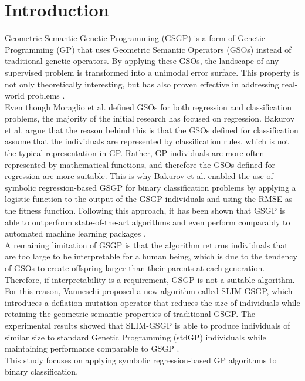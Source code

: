 \documentclass[manuscript, review, anonymous]{acmart} %
\begin{document}
\section{Introduction}
\label{cha:intro}
Geometric Semantic Genetic Programming (GSGP) \cite{Moraglio2012} is a form of Genetic Programming (GP) \cite{Koza1994} 
that uses Geometric Semantic Operators (GSOs) instead of traditional genetic operators. 
By applying these GSOs, the landscape of any supervised problem is transformed into a unimodal error surface. 
This property is not only theoretically interesting, but has also proven effective in 
addressing real-world problems \cite{Vanneschi2014}.\\
Even though Moraglio et al. \cite{Moraglio2012} defined GSOs for both regression and classification problems, 
the majority of the initial research has focused on regression. 
Bakurov et al. \cite{Bakurov2019} argue that the reason behind this is that the GSOs 
defined for classification assume that the individuals are represented by classification rules, 
which is not the typical representation in GP. Rather, GP individuals are more often represented by mathematical functions, 
and therefore the GSOs defined for regression are more suitable. 
This is why Bakurov et al. \cite{Bakurov2019} enabled the use of symbolic regression-based GSGP for binary classification problems 
by applying a logistic function to the output of the GSGP individuals and using the RMSE as the fitness function. 
Following this approach, it has been shown that GSGP is able to outperform state-of-the-art algorithms 
\cite{Bakurov2022} and even perform comparably to automated machine learning packages \cite{Frank2023}.\\
A remaining limitation of GSGP is that the algorithm returns individuals that are too large to be interpretable for a human being, 
which is due to the tendency of GSOs to create offspring larger than their parents at each generation. 
Therefore, if interpretability is a requirement, 
GSGP is not a suitable algorithm. For this reason, Vanneschi \cite{Vanneschi2024} proposed a new algorithm called SLIM-GSGP, 
which introduces a deflation mutation operator that reduces the size of individuals while retaining the geometric semantic properties of traditional GSGP. 
The experimental results showed that SLIM-GSGP is able to produce individuals of 
similar size to standard Genetic Programming (stdGP) individuals while maintaining performance comparable to GSGP \cite{Vanneschi2024}.\\
This study focuses on applying symbolic regression-based GP algorithms to binary classification. 
\end{document}
